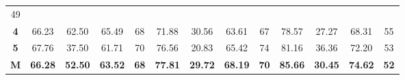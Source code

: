 \begin{table}[H]
{\begin{tabular}{ccccccccccccc}
			\multicolumn{1}{c|}{49} \\ \cline{2-13} 
			\multicolumn{1}{c|}{\cellcolor[HTML]{D9D9D9}\textbf{4}} &
			\multicolumn{1}{c|}{66.23} &
			\multicolumn{1}{c|}{62.50} &
			\multicolumn{1}{c|}{65.49} &
			\multicolumn{1}{c|}{68} &
			\multicolumn{1}{c|}{71.88} &
			\multicolumn{1}{c|}{30.56} &
			\multicolumn{1}{c|}{63.61} &
			\multicolumn{1}{c|}{67} &
			\multicolumn{1}{c|}{78.57} &
			\multicolumn{1}{c|}{27.27} &
			\multicolumn{1}{c|}{68.31} &
			\multicolumn{1}{c|}{55} \\ \cline{2-13} 
			\multicolumn{1}{c|}{\cellcolor[HTML]{D9D9D9}\textbf{5}} &
			\multicolumn{1}{c|}{67.76} &
			\multicolumn{1}{c|}{37.50} &
			\multicolumn{1}{c|}{61.71} &
			\multicolumn{1}{c|}{70} &
			\multicolumn{1}{c|}{76.56} &
			\multicolumn{1}{c|}{20.83} &
			\multicolumn{1}{c|}{65.42} &
			\multicolumn{1}{c|}{74} &
			\multicolumn{1}{c|}{81.16} &
			\multicolumn{1}{c|}{36.36} &
			\multicolumn{1}{c|}{72.20} &
			\multicolumn{1}{c|}{53} \\ \cline{2-13} 
			\multicolumn{1}{c|}{\cellcolor[HTML]{FFFF00}\textbf{M}} &
			\multicolumn{1}{c|}{\textbf{66.28}} &
			\multicolumn{1}{c|}{\textbf{52.50}} &
			\multicolumn{1}{c|}{\textbf{63.52}} &
			\multicolumn{1}{c|}{\textbf{68}} &
			\multicolumn{1}{c|}{\textbf{77.81}} &
			\multicolumn{1}{c|}{\textbf{29.72}} &
			\multicolumn{1}{c|}{\textbf{68.19}} &
			\multicolumn{1}{c|}{\textbf{70}} &
			\multicolumn{1}{c|}{\textbf{85.66}} &
			\multicolumn{1}{c|}{\textbf{30.45}} &
			\multicolumn{1}{c|}{\textbf{74.62}} &
			\multicolumn{1}{c|}{\textbf{52}} \\ \cline{2-13} 
		\end{tabular}%
	}
\end{table}